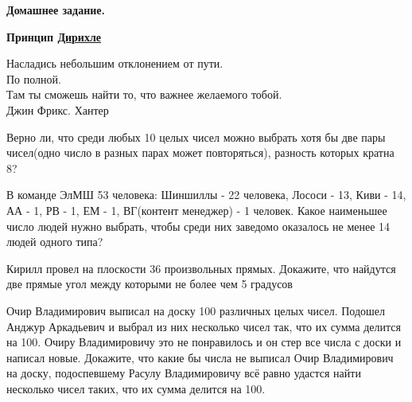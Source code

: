 \hspace{3mm}

\centerline{\bf \Huge Домашнее задание.}
\centerline{\bf \Huge Принцип \href{https://vk.com/video-91031095_456245511}{Дирихле}}

\begin{flushright}
    \scriptsize{Насладись небольшим отклонением от пути.\\ По полной.\\ Там ты сможешь найти то, что важнее желаемого тобой. \\Джин Фрикс. Хантер}
\end{flushright}

 Верно ли, что среди любых 10 целых чисел можно выбрать хотя бы две пары чисел(одно число в разных парах может повторяться), разность которых кратна 8?

 В команде ЭлМШ 53 человека:
Шиншиллы - 22 человека, Лососи - 13, Киви - 14, АА - 1, РВ - 1, ЕМ - 1, ВГ(контент менеджер) - 1 человек. Какое наименьшее число людей нужно выбрать, чтобы среди них заведомо оказалось не менее 14 людей одного типа?

Кирилл провел на плоскости 36 произвольных прямых. Докажите, что найдутся две прямые угол между которыми не более чем 5 градусов

Очир Владимирович выписал на доску 100 различных целых чисел. Подошел Анджур Аркадьевич и выбрал из них несколько чисел так, что их сумма делится на 100. Очиру Владимировичу это не понравилось и он стер все числа с доски и написал новые. Докажите, что какие бы числа не выписал Очир Владимирович на доску, подоспевшему Расулу Владимировичу всё равно удастся найти несколько чисел таких, что их сумма делится на 100.